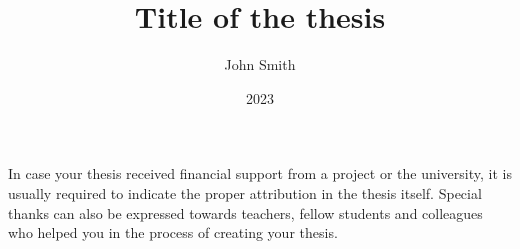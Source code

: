 \documentclass[
]{elteikthesis}[2023/04/10]
\title{Title of the thesis} %
\date{2023} %
\author{John Smith}
\affiliation{Assistant Lecturer} %
\begin{document}


\maketitle
%

\tableofcontents
\cleardoublepage


\cleardoublepage


\cleardoublepage


\cleardoublepage


\cleardoublepage

\chapter*{\acklabel}
In case your thesis received financial support from a project or the university, it is usually required to indicate the proper attribution in the thesis itself. Special thanks can also be expressed towards teachers, fellow students and colleagues who helped you in the process of creating your thesis.

\appendix

\cleardoublepage

{}
\printbibliography[title=\biblabel]
\cleardoublepage

{}
\listoffigures
\cleardoublepage

{}
\listoftables
\cleardoublepage

{}
\listofalgorithms
\cleardoublepage

{}
\lstlistoflistings
\cleardoublepage

\end{document}
